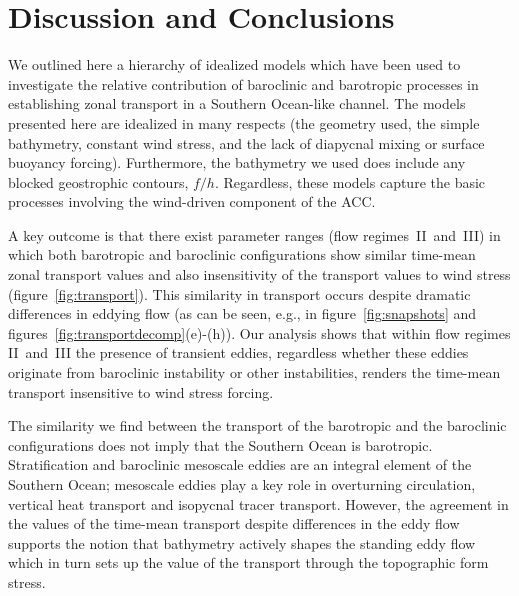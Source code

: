 \documentclass{agujournal2019}
\begin{document}
\section{Discussion and Conclusions}

We outlined here a hierarchy of idealized models which have been used to investigate the relative contribution of baroclinic and barotropic processes in establishing zonal transport in a Southern Ocean-like channel. The models presented here are idealized in many respects (the geometry used, the simple bathymetry, constant wind stress, and the lack of diapycnal mixing or surface buoyancy forcing). Furthermore, the bathymetry we used does include any blocked geostrophic contours, $f/h$. Regardless, these models capture the basic processes involving the wind-driven component of the ACC.

A key outcome is that there exist parameter ranges (flow regimes~II~and~III) in which both barotropic and baroclinic configurations show similar time-mean zonal  transport values and also insensitivity of the transport values to wind stress (figure~\ref{fig:transport}). This similarity in transport occurs despite dramatic differences in eddying flow (as can be seen, e.g., in figure~\ref{fig:snapshots} and figures~\ref{fig:transportdecomp}(e)-(h)). Our analysis shows that within flow regimes II~and~III the presence of transient eddies, regardless whether these eddies originate from baroclinic instability or other instabilities, renders the time-mean transport insensitive to wind stress forcing. 


The similarity we find between the transport of the barotropic and the baroclinic configurations does not imply that the Southern Ocean is barotropic. Stratification and baroclinic mesoscale eddies are an integral element of the Southern Ocean; mesoscale eddies play a key role in overturning circulation, vertical heat transport and isopycnal tracer transport. However, the agreement in the values of the time-mean transport despite differences in the eddy flow supports the notion that bathymetry actively shapes the standing eddy flow which in turn sets up the value of the transport through the topographic form stress.
\end{document}
